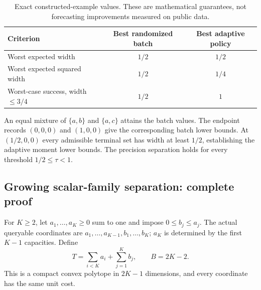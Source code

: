 \begin{table}[htbp]
\centering
\caption{Exact constructed-example values. These are mathematical
guarantees, not forecasting improvements measured on public data.}
\label{tab:risk_three_coordinate}
\begin{tabular}{lcc}
\toprule
Criterion & Best randomized batch & Best adaptive policy\\
\midrule
Worst expected width & $1/2$ & $1/2$\\
Worst expected squared width & $1/2$ & $1/4$\\
Worst-case success, width $\le3/4$ & $1/2$ & $1$\\
\bottomrule
\end{tabular}
\end{table}

An equal mixture of $\{a,b\}$ and $\{a,c\}$ attains the batch values.
The endpoint records $(0,0,0)$ and $(1,0,0)$ give the corresponding
batch lower bounds. At $(1/2,0,0)$ every admissible terminal set has
width at least $1/2$, establishing the adaptive moment lower bounds.
The precision separation holds for every threshold $1/2\le\tau<1$.

\subsection{Growing scalar-family separation: complete proof}
\label{sec:risk_growing}
For $K\ge2$, let $a_1,\ldots,a_K\ge0$ sum to one and impose
$0\le b_j\le a_j$. The actual queryable coordinates are
$a_1,\ldots,a_{K-1},b_1,\ldots,b_K$; $a_K$ is determined by the
first $K-1$ capacities. Define
\begin{equation}
 T=\sum_{i<K}a_i+\sum_{j=1}^K b_j,\qquad B=2K-2.
 \label{eq:risk_K_setup}
\end{equation}
This is a compact convex polytope in $2K-1$ dimensions, and every
coordinate has the same unit cost.

